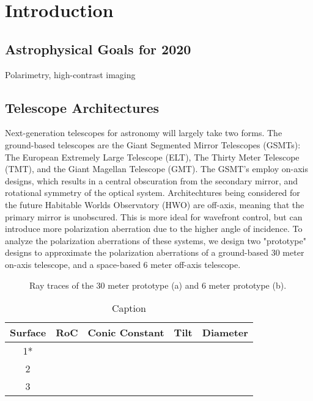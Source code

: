 \section{Introduction}

\subsection{Astrophysical Goals for 2020}
Polarimetry, high-contrast imaging

\subsection{Telescope Architectures}
Next-generation telescopes for astronomy will largely take two forms. The ground-based telescopes are the Giant Segmented Mirror Telescopes (GSMTs): The European Extremely Large Telescope (ELT), The Thirty Meter Telescope (TMT), and the Giant Magellan Telescope (GMT). The GSMT's employ on-axis designs, which results in a central obscuration from the secondary mirror, and rotational symmetry of the optical system. Architechtures being considered for the future Habitable Worlds Observatory (HWO) are off-axis, meaning that the primary mirror is unobscured. This is more ideal for wavefront control, but can introduce more polarization aberration due to the higher angle of incidence. To analyze the polarization aberrations of these systems, we design two "prototype" designs to approximate the polarization aberrations of a ground-based 30 meter on-axis telescope, and a space-based 6 meter off-axis telescope.

\begin{figure}[H]
    \centering
    \caption{Ray traces of the 30 meter prototype (a) and 6 meter prototype (b).}
    \label{fig:raytraces}
\end{figure}

\begin{table}[H]
    \centering
    \begin{tabular}{c c c c c}
    \hline
        Surface & RoC & Conic Constant & Tilt & Diameter  \\
    \hline
        1* & & & & \\
        2 & & & & \\
        3 & & & & \\
    \hline
    \hline
    \end{tabular}
    \caption{Caption}
    \label{tab:ground_prescription}
\end{table}

